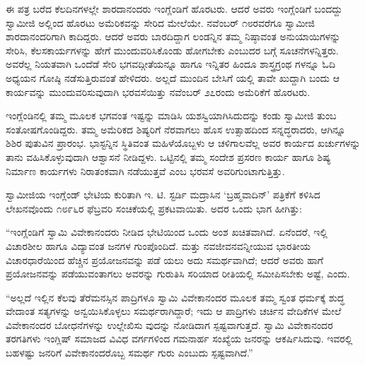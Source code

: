 ಈ ಪತ್ರ ಬರೆದ ಕೆಲದಿನಗಳಲ್ಲೇ ಶಾರದಾನಂದರು ಇಂಗ್ಲೆಂಡಿಗೆ ಹೊರಟರು. ಆದರೆ ಅವರು ಇಂಗ್ಲೆಂಡಿಗೆ ಬಂದದ್ದು ಸ್ವಾಮೀಜಿ ಅಲ್ಲಿಂದ ಹೊರಟು ಅಮೆರಿಕವನ್ನು ಸೇರಿದ ಮೇಲೆಯೇ. ನವೆಂಬರ್ ೧೮ರವರೆಗೂ ಸ್ವಾಮೀಜಿ ಶಾರದಾನಂದರಿಗಾಗಿ ಕಾದಿದ್ದರು. ಆದರೆ ಅವರು ಬಾರದಿದ್ದಾಗ ಲಂಡನ್ನಿನ ತಮ್ಮ ನಿಷ್ಠಾವಂತ ಅನುಯಾಯಿಗಳನ್ನು ಸೇರಿಸಿ, ಕೆಲಸಕಾರ್ಯಗಳನ್ನು ಹೇಗೆ ಮುಂದುವರಿಸಿಕೊಂಡು ಹೋಗಬೇಕು ಎಂಬುದರ ಬಗ್ಗೆ ಸೂಚನೆಗಳನ್ನಿತ್ತರು. ಅವರೆಲ್ಲ ನಿಯತವಾಗಿ ಒಂದೆಡೆ ಸೇರಿ ಭಗವದ್ಗೀತೆಯನ್ನೂ ಹಾಗೂ ಇನ್ನಿತರ ಹಿಂದೂ ಶಾಸ್ತ್ರಗ್ರಂಥ ಗಳನ್ನೂ ಓದಿ ಅಧ್ಯಯನ ಗೋಷ್ಠಿ ನಡೆಸುತ್ತಿರುವಂತೆ ಹೇಳಿದರು. ಅಲ್ಲದೆ ಮುಂದಿನ ಬೇಸಿಗೆ ಯಲ್ಲಿ ತಾವೇ ಖುದ್ದಾಗಿ ಬಂದು ಆ ಕಾರ್ಯವನ್ನು ಮುಂದುವರಿಸುವುದಾಗಿ ಭರವಸೆಯಿತ್ತು ನವೆಂಬರ್ ೨೭ರಂದು ಅಮೆರಿಕೆಗೆ ಹೊರಟರು.

ಇಂಗ್ಲೆಂಡಿನಲ್ಲಿ ತಮ್ಮ ಮೂಲಕ ಭಗವಂತ ಇಷ್ಟನ್ನು ಮಾಡಿಸಿ ಯಶಸ್ವಿಯಾಗಿಸಿದುದನ್ನು ಕಂಡು ಸ್ವಾಮೀಜಿ ತುಂಬ ಸಂತೋಷಗೊಂಡಿದ್ದರು. ತಮ್ಮ ಅಮೆರಿಕದ ಶಿಷ್ಯರಿಗೆ ನೆರವಾಗಲು ಹೊಸ ಉತ್ಸಾಹದಿಂದ ಸನ್ನದ್ಧರಾದರು, ಆಗಿನ್ನೂ ಶಿಶಿರ ಪುತುವಿನ ಪ್ರಾರಂಭ. ಭಾಸ್ಟನ್ನಿನ ಸ್ಥಿತಿವಂತ ಮಹಿಳೆಯೊಬ್ಬಳು ಆ ಚಳಿಗಾಲವೆಲ್ಲ ಅವರ ಕಾರ್ಯದ ಖರ್ಚುಗಳನ್ನು ತಾನು ವಹಿಸಿಕೊಳ್ಳುವುದಾಗಿ ಆಶ್ವಾಸನೆ ನೀಡಿದ್ದಳು. ಒಟ್ಟಿನಲ್ಲಿ ತಮ್ಮ ಸಂದೇಶ ಪ್ರಸರಣ ಕಾರ್ಯ ಹಾಗೂ ಶಿಷ್ಯ ನಿರ್ಮಾಣ ಕಾರ್ಯಗಳು ನಿರಾತಂಕವಾಗಿ ನಡೆಯುತ್ತವೆ ಎಂಬ ಭರವಸೆ ಅವರಿಗುಂಟಾಗುತ್ತಿತ್ತು.

ಸ್ವಾಮೀಜಿಯ ಇಂಗ್ಲೆಂಡ್ ಭೇಟಿಯ ಕುರಿತಾಗಿ ಇ. ಟಿ. ಸ್ಟರ್ಡಿ ಮದ್ರಾಸಿನ ‘ಬ್ರಹ್ಮವಾದಿನ್​’ ಪತ್ರಿಕೆಗೆ ಕಳಿಸಿದ ಲೇಖನವೊಂದು ೧೮೯೬ರ ಫೆಬ್ರವರಿ ಸಂಚಿಕೆಯಲ್ಲಿ ಪ್ರಕಟವಾಯಿತು. ಅದರ ಒಂದು ಭಾಗ ಹೀಗಿತ್ತು:

“ಇಂಗ್ಲೆಂಡಿಗೆ ಸ್ವಾಮಿ ವಿವೇಕಾನಂದರು ನೀಡಿದ ಭೇಟಿಯಿಂದ ಒಂದು ಅಂಶ ಖಚಿತವಾಗಿದೆ. ಏನೆಂದರೆ, ಇಲ್ಲಿ ವಿಚಾರಶೀಲ ಹಾಗೂ ವಿದ್ಯಾವಂತ ಜನಗಳ ಗುಂಪೊಂದಿದೆ. ಮತ್ತು ನವಜೀವನವನ್ನೀಯುವ ಭಾರತೀಯ ವಿಚಾರಧಾರೆಯಿಂದ ಹೆಚ್ಚಿನ ಪ್ರಯೋಜನವನ್ನು ಪಡೆ ಯಲು ಅದು ಸಮರ್ಥವಾಗಿದೆ; ಆದರೆ ಅವರು ಹಾಗೆ ಪ್ರಯೋಜನವನ್ನು ಪಡೆಯುವಂತಾಗಲು ಅವರನ್ನು ಗುರುತಿಸಿ ಸರಿಯಾದ ರೀತಿಯಲ್ಲಿ ಸಮೀಪಿಸಬೇಕು ಅಷ್ಟೆ, ಎಂದು.

“ಅಲ್ಲದೆ ಇಲ್ಲಿನ ಕೆಲವು ತೆರೆಮನಸ್ಸಿನ ಪಾದ್ರಿಗಳೂ ಸ್ವಾಮಿ ವಿವೇಕಾನಂದರ ಮೂಲಕ ತಮ್ಮ ಸ್ವಂತ ಧರ್ಮಕ್ಕೆ ಶುದ್ಧ ವೇದಾಂತ ಸತ್ಯಗಳನ್ನು ಅನ್ವಯಿಸಿಕೊಳ್ಳಲು ಸಮರ್ಥರಾಗಿದ್ದಾರೆ; ಇದು ಆ ಪಾದ್ರಿಗಳು ಚರ್ಚಿನ ವೇದಿಕೆಗಳ ಮೇಲೆ ವಿವೇಕಾನಂದರ ಬೋಧನೆಗಳನ್ನು ಉಲ್ಲೇಖಿಸು ವುದನ್ನು ನೋಡಿದಾಗ ಸ್ಪಷ್ಟವಾಗುತ್ತದೆ. ಸ್ವಾಮಿ ವಿವೇಕಾನಂದರ ತರಗತಿಗಳು ಇಂಗ್ಲಿಷ್ ಸಮಾಜದ ವಿವಿಧ ವರ್ಗಗಳಿಂದ ಗಮನಾರ್ಹ ಸಂಖ್ಯೆಯ ಜನರನ್ನು ಆಕರ್ಷಿಸಿದುವು. ಇವರಲ್ಲಿ ಬಹಳಷ್ಟು ಜನರಿಗೆ ವಿವೇಕಾನಂದರೊಬ್ಬ ಸಮರ್ಥ ಗುರು ಎಂಬುದು ಸ್ಪಷ್ಟವಾಗಿದೆ.”


